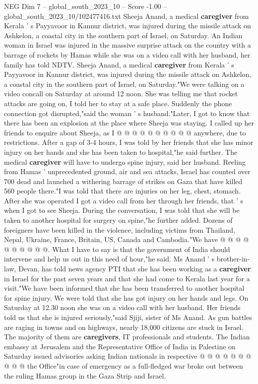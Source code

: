 \begin{textsample}{NEG Dim 7 – global\_south\_2023\_10 – Score -1.00 – global\_south\_2023\_10/102477416.txt}  \label{ex:f7_neg_061}
Sheeja Anand, a medical \textbf{caregiver} from Kerala ' s Payyavoor in Kannur district, was injured during the missile attack on Ashkelon, a coastal city in the southern part of Israel, on Saturday.
An Indian woman in Israel was injured in the massive surprise attack on the country with a barrage of rockets by Hamas while she was on a video call with her husband, her family has told NDTV.
Sheeja Anand, a medical \textbf{caregiver} from Kerala ' s Payyavoor in Kannur district, was injured during the missile attack on Ashkelon, a coastal city in the southern part of Israel, on Saturday."We were talking on a video concall on Saturday at around 12 noon.
She was telling me that rocket attacks are going on, I told her to stay at a safe place.
Suddenly the phone connection got disrupted,"said the woman ' s husband."Later, I got to know that there has been an explosion at the place where Sheeja was staying.
I called up her friends to enquire about Sheeja, as I @ @ @ @ @ @ @ @ @ @ anywhere, due to restrictions.
After a gap of 3-4 hours, I was told by her friends that she has minor injury on her hands and she has been taken to hospital,"he said further.
The medical \textbf{caregiver} will have to undergo spine injury, said her husband.
Reeling from Hamas ' unprecedented ground, air and sea attacks, Israel has counted over 700 dead and launched a withering barrage of strikes on Gaza that have killed 560 people there."I was told that there are injuries on her leg, chest, stomach.
After she was operated I got a video call from her through her friends, that ' s when I got to see Sheeja.
During the conversation, I was told that she will be taken to another hospital for surgery on spine,"he further added.
Dozens of foreigners have been killed in the violence, including victims from Thailand, Nepal, Ukraine, France, Britain, US, Canada and Cambodia."We have @ @ @ @ @ @ @ @ @ @.
What I have to say is that the government of India should intervene and help us out in this need of hour,"he said.
Ms Anand ' s brother-in-law, Devan, has told news agency PTI that she has been working as a \textbf{caregiver} in Israel for the past seven years and that she had come to Kerala last year for a visit."We have been informed that she has been transferred to another hospital for spine injury.
We were told that she has got injury on her hands and legs.
On Saturday at 12.30 noon she was on a video call with her husband.
Her friends told us that she is injured seriously,"said Sjiji, sister of Ms Anand.
As gun battles are raging in towns and on highways, nearly 18,000 citizens are stuck in Israel.
The majority of them are \textbf{caregivers}, IT professionals and students.
The Indian embassy at Jerusalem and the Representative Office of India in Palestine on Saturday issued advisories asking Indian nationals in respective @ @ @ @ @ @ @ @ @ @ the Office"in case of emergency as a full-fledged war broke out between the ruling Hamas group in the Gaza Strip and Israel.

\end{textsample}
